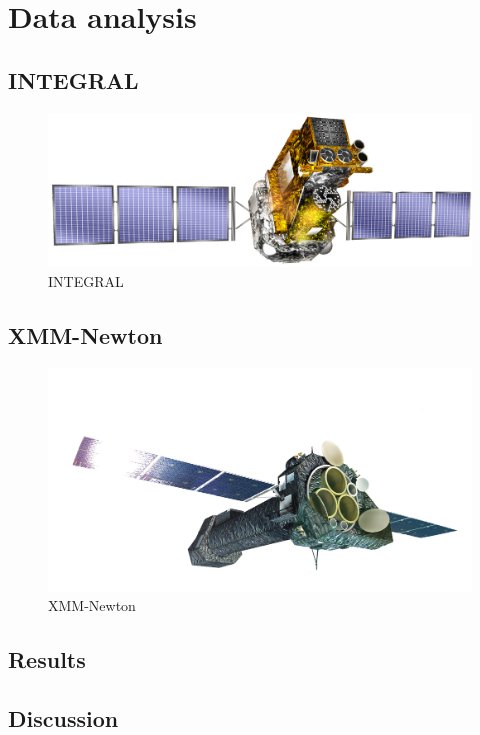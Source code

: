 \documentclass[oneside,a4paper,11pt]{report}
\begin{document}
\chapter{Data analysis}

\section{INTEGRAL}

\begin{figure}[!hbt]
\centering
\includegraphics[totalheight=4cm]{integral}
\caption{INTEGRAL}
\label{microblazar} 
\end{figure}


\section{XMM-Newton}

\begin{figure}[!hbt]
\centering
\includegraphics[totalheight=6cm]{XMM}
\caption{XMM-Newton }
\label{microblazar} 
\end{figure}


\section{Results}
\section{Discussion}
\end{document}
